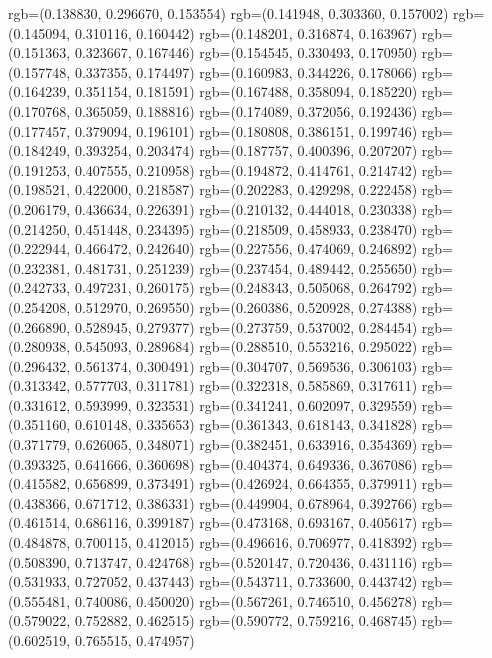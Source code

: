 {{{					rgb=(0.138830, 0.296670, 0.153554)
					rgb=(0.141948, 0.303360, 0.157002)
					rgb=(0.145094, 0.310116, 0.160442)
					rgb=(0.148201, 0.316874, 0.163967)
					rgb=(0.151363, 0.323667, 0.167446)
					rgb=(0.154545, 0.330493, 0.170950)
					rgb=(0.157748, 0.337355, 0.174497)
					rgb=(0.160983, 0.344226, 0.178066)
					rgb=(0.164239, 0.351154, 0.181591)
					rgb=(0.167488, 0.358094, 0.185220)
					rgb=(0.170768, 0.365059, 0.188816)
					rgb=(0.174089, 0.372056, 0.192436)
					rgb=(0.177457, 0.379094, 0.196101)
					rgb=(0.180808, 0.386151, 0.199746)
					rgb=(0.184249, 0.393254, 0.203474)
					rgb=(0.187757, 0.400396, 0.207207)
					rgb=(0.191253, 0.407555, 0.210958)
					rgb=(0.194872, 0.414761, 0.214742)
					rgb=(0.198521, 0.422000, 0.218587)
					rgb=(0.202283, 0.429298, 0.222458)
					rgb=(0.206179, 0.436634, 0.226391)
					rgb=(0.210132, 0.444018, 0.230338)
					rgb=(0.214250, 0.451448, 0.234395)
					rgb=(0.218509, 0.458933, 0.238470)
					rgb=(0.222944, 0.466472, 0.242640)
					rgb=(0.227556, 0.474069, 0.246892)
					rgb=(0.232381, 0.481731, 0.251239)
					rgb=(0.237454, 0.489442, 0.255650)
					rgb=(0.242733, 0.497231, 0.260175)
					rgb=(0.248343, 0.505068, 0.264792)
					rgb=(0.254208, 0.512970, 0.269550)
					rgb=(0.260386, 0.520928, 0.274388)
					rgb=(0.266890, 0.528945, 0.279377)
					rgb=(0.273759, 0.537002, 0.284454)
					rgb=(0.280938, 0.545093, 0.289684)
					rgb=(0.288510, 0.553216, 0.295022)
					rgb=(0.296432, 0.561374, 0.300491)
					rgb=(0.304707, 0.569536, 0.306103)
					rgb=(0.313342, 0.577703, 0.311781)
					rgb=(0.322318, 0.585869, 0.317611)
					rgb=(0.331612, 0.593999, 0.323531)
					rgb=(0.341241, 0.602097, 0.329559)
					rgb=(0.351160, 0.610148, 0.335653)
					rgb=(0.361343, 0.618143, 0.341828)
					rgb=(0.371779, 0.626065, 0.348071)
					rgb=(0.382451, 0.633916, 0.354369)
					rgb=(0.393325, 0.641666, 0.360698)
					rgb=(0.404374, 0.649336, 0.367086)
					rgb=(0.415582, 0.656899, 0.373491)
					rgb=(0.426924, 0.664355, 0.379911)
					rgb=(0.438366, 0.671712, 0.386331)
					rgb=(0.449904, 0.678964, 0.392766)
					rgb=(0.461514, 0.686116, 0.399187)
					rgb=(0.473168, 0.693167, 0.405617)
					rgb=(0.484878, 0.700115, 0.412015)
					rgb=(0.496616, 0.706977, 0.418392)
					rgb=(0.508390, 0.713747, 0.424768)
					rgb=(0.520147, 0.720436, 0.431116)
					rgb=(0.531933, 0.727052, 0.437443)
					rgb=(0.543711, 0.733600, 0.443742)
					rgb=(0.555481, 0.740086, 0.450020)
					rgb=(0.567261, 0.746510, 0.456278)
					rgb=(0.579022, 0.752882, 0.462515)
					rgb=(0.590772, 0.759216, 0.468745)
					rgb=(0.602519, 0.765515, 0.474957)
}}}
